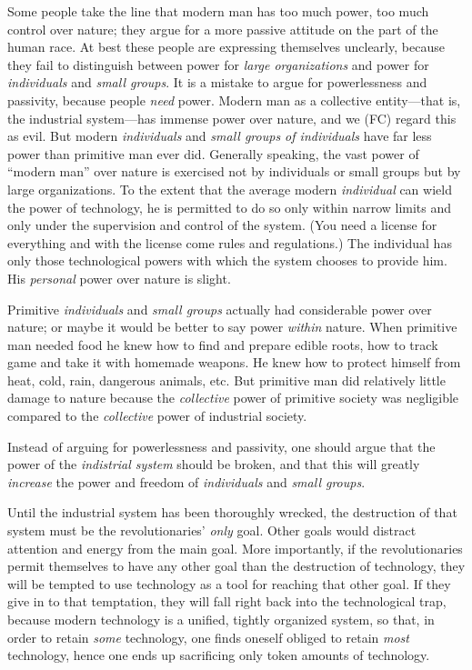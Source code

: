  Some people take the line that modern man has too much power, too much control over nature; they argue for a more passive attitude on the part of the human race. At best these people are expressing themselves unclearly, because they fail to distinguish between power for {\em large organizations} and power for {\em individuals} and {\em small groups}. It is a mistake to argue for powerlessness and passivity, because people {\em need} power. Modern man as a collective entity—that is, the industrial system—has immense power over nature, and we (FC) regard this as evil. But modern {\em individuals} and {\em small groups of individuals} have far less power than primitive man ever did. Generally speaking, the vast power of “modern man” over nature is exercised not by individuals or small groups but by large organizations. To the extent that the average modern {\em individual} can wield the power of technology, he is permitted to do so only within narrow limits and only under the supervision and control of the system. (You need a license for everything and with the license come rules and regulations.) The individual has only those technological powers with which the system chooses to provide him. His {\em personal} power over nature is slight.

 Primitive {\em individuals} and {\em small groups} actually had considerable power over nature; or maybe it would be better to say power {\em within} nature. When primitive man needed food he knew how to find and prepare edible roots, how to track game and take it with homemade weapons. He knew how to protect himself from heat, cold, rain, dangerous animals, etc. But primitive man did relatively little damage to nature because the {\em collective} power of primitive society was negligible compared to the {\em collective} power of industrial society.

 Instead of arguing for powerlessness and passivity, one should argue that the power of the {\em indistrial system} should be broken, and that this will greatly {\em increase} the power and freedom of {\em individuals} and {\em small groups}.

 Until the industrial system has been thoroughly wrecked, the destruction of that system must be the revolutionaries’ {\em only} goal. Other goals would distract attention and energy from the main goal. More importantly, if the revolutionaries permit themselves to have any other goal than the destruction of technology, they will be tempted to use technology as a tool for reaching that other goal. If they give in to that temptation, they will fall right back into the technological trap, because modern technology is a unified, tightly organized system, so that, in order to retain {\em some} technology, one finds oneself obliged to retain {\em most} technology, hence one ends up sacrificing only token amounts of technology.

